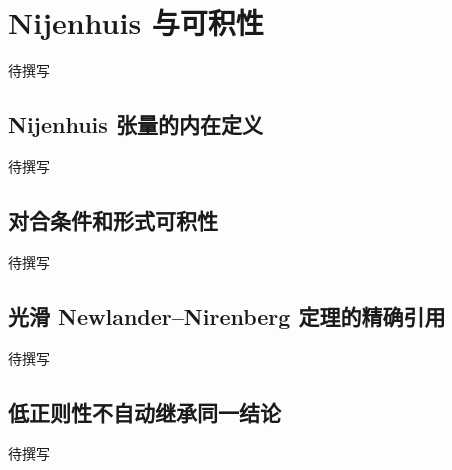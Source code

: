 
% 
% 

\section{Nijenhuis 与可积性}
\label{g4:sec:1502}

待撰写

\subsection{Nijenhuis 张量的内在定义}
\label{g4:subsec:1502:01}
待撰写

\subsection{对合条件和形式可积性}
\label{g4:subsec:1502:02}
待撰写

\subsection{光滑 Newlander–Nirenberg 定理的精确引用}
\label{g4:subsec:1502:03}
待撰写

\subsection{低正则性不自动继承同一结论}
\label{g4:subsec:1502:04}
待撰写
